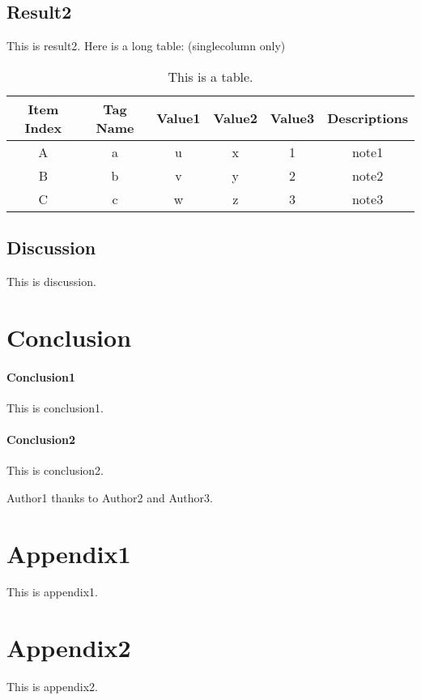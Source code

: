 \documentclass[
preprint, %
10pt,
oneside,
onecolumn, 1p,
authoryear, %
times,
]{elsarticle}
\begin{document}
\subsection{Result2}
This is result2.
Here is a long table: (singlecolumn only)
\begin{longtable}{c | c | c | c | c | c}
\caption{This is a table.}
\label{tab:table1}\\
\hline
\textbf{Item Index} & \textbf{Tag Name} & \textbf{Value1} & \textbf{Value2} & \textbf{Value3} & \textbf{Descriptions} \\
\hline
A & a & u & x & 1 & note1 \\
\hline
B & b & v & y & 2 & note2 \\
\hline
C & c & w & z & 3 & note3 \\
\hline
\end{longtable}

\subsection{Discussion}
This is discussion.

\section{Conclusion}
\paragraph{Conclusion1}
This is conclusion1.

\paragraph{Conclusion2}
This is conclusion2.

Author1 thanks to Author2 and Author3.



\newpage

\appendix
\section*{Appendix1}
This is appendix1.

\section*{Appendix2}
This is appendix2.
\end{document}
